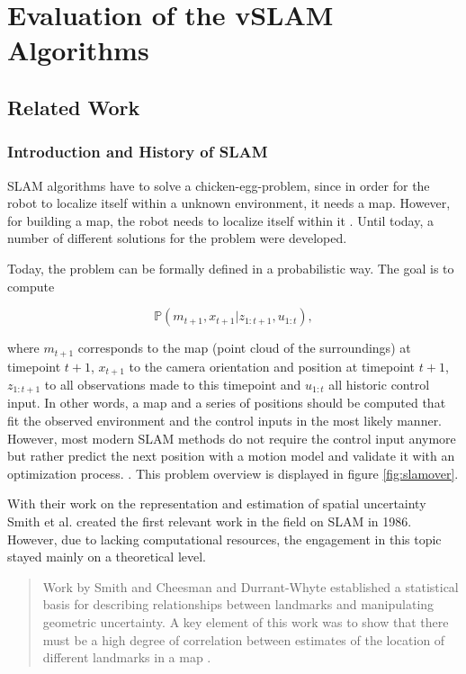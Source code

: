 \chapter{Evaluation of the vSLAM Algorithms}
\section{Related Work}

\subsection{Introduction and History of SLAM}

SLAM algorithms have to solve a chicken-egg-problem, since in order for the robot to localize itself within a unknown environment, 
it needs a map. However, for building a map, the robot needs to localize itself within it \cite{chicken}. Until today, a number of 
different solutions for the problem were developed. 

Today, the problem can be formally defined in a probabilistic way. The goal is to compute 

\begin{equation}\label{prob}
\mathbb{P}\left(m_{t+1},x_{t+1}|z_{1:t+1},u_{1:t}\right),
\end{equation}

where $m_{t+1}$ corresponds to the map (point cloud of the surroundings) at timepoint $t+1$, $x_{t+1}$ to the 
camera orientation and position at timepoint $t+1$, $z_{1:t+1}$ to all observations made to this timepoint and $u_{1:t}$ all historic control input. 
In other words, a map and a series of positions should be computed that fit the observed environment and the control inputs in the most likely manner. 
However, most
modern SLAM methods do not require the control input anymore but rather predict the next position with a motion model and validate it with an 
optimization process. \cite{dso} \cite{orb}. 
This problem overview is displayed in figure \ref{fig:slamover}. 


With their work on the representation and estimation of spatial uncertainty \cite{hist1}
Smith et al. created the first relevant work in the field on SLAM in 1986. However, due to lacking computational resources, the engagement in this topic stayed mainly
on a theoretical level. 

  \begin{quote}
	 Work by Smith and
Cheesman and Durrant-Whyte established a statistical basis for describing relationships between landmarks and
manipulating geometric uncertainty. A key element of this
work was to show that there must be a high degree of correlation between estimates of the location of different landmarks in a map \cite{hist2}.
  \end{quote}

